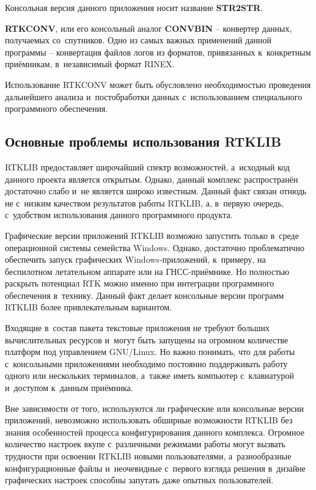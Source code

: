 \begin{dashitemize}
  Консольная версия данного приложения носит название \textbf{STR2STR}.
  
  \item \textbf{RTKCONV}, или его консольный аналог \textbf{CONVBIN} -- конвертер данных, получаемых со~спутников. Одно из самых важных применений данной программы -- конвертация файлов логов из форматов, привязанных к~конкретным приёмникам, в~независимый формат RINEX. \par
  
  Использование RTKCONV может быть обусловлено необходимостью проведения дальнейшего анализа и~постобработки данных с~использованием специального программного обеспечения.
\end{dashitemize}

\subsection{Основные проблемы использования RTKLIB}

RTKLIB предоставляет широчайший спектр возможностей, а~исходный код данного проекта является открытым. Однако, данный комплекс распространён достаточно слабо и~не является широко известным. Данный факт связан отнюдь не с~низким качеством результатов работы RTKLIB, а, в~первую очередь, с~удобством использования данного программного продукта. \par

Графические версии приложений RTKLIB возможно запустить только в~среде операционной системы семейства Windows. Однако, достаточно проблематично обеспечить запуск графических Windows-приложений, к~примеру, на беспилотном летательном аппарате или на ГНСС-приёмнике. Но полностью раскрыть потенциал RTK можно именно при интеграции программного обеспечения в~технику. Данный факт делает консольные версии программ RTKLIB более привлекательным вариантом. \par

Входящие в~состав пакета текстовые приложения не требуют больших вычислительных ресурсов и~могут быть запущены на огромном количестве платформ под управлением GNU/Linux. Но важно понимать, что для работы с~консольными приложениями необходимо постоянно поддерживать работу одного или нескольких терминалов, а~также иметь компьютер с~клавиатурой и~доступом к~данным приёмника. \par

Вне зависимости от того, используются ли графические или консольные версии приложений, невозможно использовать обширные возможности RTKLIB без знания особенностей процесса конфигурирования данного комплекса. Огромное количество настроек вкупе с~различными режимами работы могут вызвать трудности при освоении RTKLIB новыми пользователями, а~разнообразные конфигурационные файлы и~неочевидные с~первого взгляда решения в~дизайне графических настроек способны запутать даже опытных пользователей.

